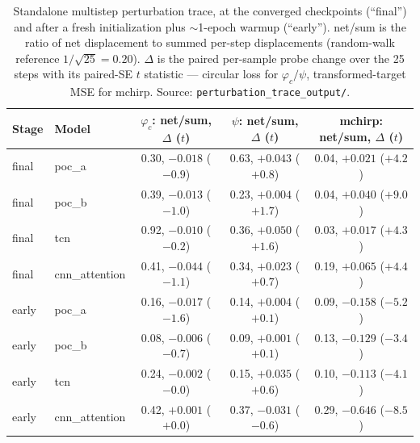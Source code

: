 \begin{table}[tbp]
    \centering
    \caption{Standalone multistep perturbation trace, at the converged checkpoints (``final'') and after a fresh initialization plus ${\sim}$1-epoch warmup (``early'').
        net/sum is the ratio of net displacement to summed per-step displacements (random-walk reference $1/\sqrt{25} = 0.20$).
        $\Delta$ is the paired per-sample probe change over the 25 steps with its paired-SE $t$ statistic --- circular loss for $\varphi_c/\psi$, transformed-target MSE for mchirp.
        Source: \texttt{perturbation\_trace\_output/}.}
    \label{tab:phicpsi:trace}
    \small
    \begin{tabular}{@{}llccc@{}}
        \toprule
        Stage & Model & $\varphi_c$: net/sum, $\Delta$ ($t$) & $\psi$: net/sum, $\Delta$ ($t$) & mchirp: net/sum, $\Delta$ ($t$) \\
        \midrule
        final & poc\_a         & 0.30, $-0.018$ ($-0.9$) & 0.63, $+0.043$ ($+0.8$) & 0.04, $+0.021$ ($+4.2$) \\
        final & poc\_b         & 0.39, $-0.013$ ($-1.0$) & 0.23, $+0.004$ ($+1.7$) & 0.04, $+0.040$ ($+9.0$) \\
        final & tcn            & 0.92, $-0.010$ ($-0.2$) & 0.36, $+0.050$ ($+1.6$) & 0.03, $+0.017$ ($+4.3$) \\
        final & cnn\_attention & 0.41, $-0.044$ ($-1.1$) & 0.34, $+0.023$ ($+0.7$) & 0.19, $+0.065$ ($+4.4$) \\
        early & poc\_a         & 0.16, $-0.017$ ($-1.6$) & 0.14, $+0.004$ ($+0.1$) & 0.09, $\mathbf{-0.158}$ ($\mathbf{-5.2}$) \\
        early & poc\_b         & 0.08, $-0.006$ ($-0.7$) & 0.09, $+0.001$ ($+0.1$) & 0.13, $\mathbf{-0.129}$ ($\mathbf{-3.4}$) \\
        early & tcn            & 0.24, $-0.002$ ($-0.0$) & 0.15, $+0.035$ ($+0.6$) & 0.10, $\mathbf{-0.113}$ ($\mathbf{-4.1}$) \\
        early & cnn\_attention & 0.42, $+0.001$ ($+0.0$) & 0.37, $-0.031$ ($-0.6$) & 0.29, $\mathbf{-0.646}$ ($\mathbf{-8.5}$) \\
        \bottomrule
    \end{tabular}
\end{table}


